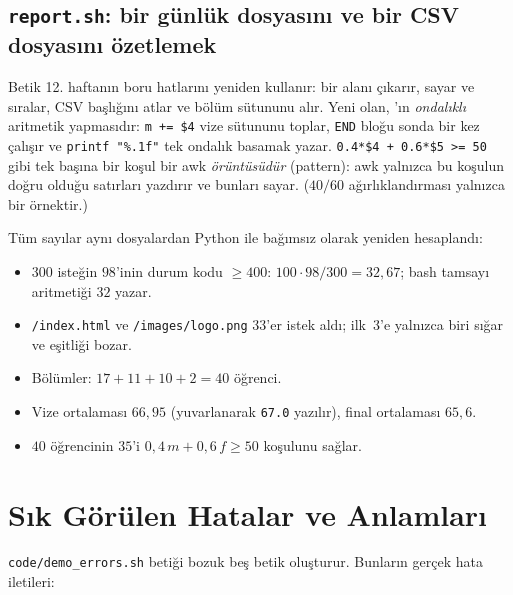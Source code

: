 \subsection{\texttt{report.sh}: bir günlük dosyasını ve bir CSV dosyasını özetlemek}




Betik 12. haftanın boru hatlarını yeniden kullanır:  bir alanı çıkarır,  sayar ve sıralar,  CSV başlığını atlar ve  bölüm sütununu alır. Yeni olan, 'ın \emph{ondalıklı} aritmetik yapmasıdır: \texttt{m += \$4} vize sütununu toplar, \texttt{END} bloğu sonda bir kez çalışır ve \texttt{printf "\%.1f"} tek ondalık basamak yazar. \texttt{0.4*\$4 + 0.6*\$5 >= 50} gibi tek başına bir koşul bir awk \emph{örüntüsüdür} (pattern): awk yalnızca bu koşulun doğru olduğu satırları yazdırır ve  bunları sayar. ($40/60$ ağırlıklandırması yalnızca bir örnektir.)

\begin{example}
Tüm sayılar aynı dosyalardan Python ile bağımsız olarak yeniden hesaplandı:
\begin{itemize}
  \item $300$ isteğin $98$'inin durum kodu $\ge 400$: $100 \cdot 98 / 300 = 32{,}67$; bash tamsayı aritmetiği $32$ yazar.
  \item \texttt{/index.html} ve \texttt{/images/logo.png} $33$'er istek aldı; ilk~3'e yalnızca biri sığar ve eşitliği  bozar.
  \item Bölümler: $17 + 11 + 10 + 2 = 40$ öğrenci.
  \item Vize ortalaması $66{,}95$ (yuvarlanarak \texttt{67.0} yazılır), final ortalaması $65{,}6$.
  \item $40$ öğrencinin $35$'i $0{,}4\,m + 0{,}6\,f \ge 50$ koşulunu sağlar.
\end{itemize}
\end{example}

\section{Sık Görülen Hatalar ve Anlamları}
\label{sec:errors}

\texttt{code/demo\_errors.sh} betiği bozuk beş betik oluşturur. Bunların gerçek hata iletileri:

